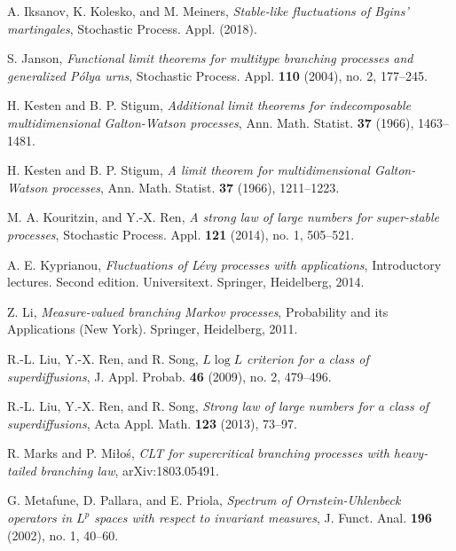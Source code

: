 \documentclass[12pt,a4paper]{amsart}
\theoremstyle{plain}
\theoremstyle{definition}
\numberwithin{equation}{section}
\begin{document}
\begin{thebibliography}{10}
  A. Iksanov, K. Kolesko, and M. Meiners,
  \emph{Stable-like fluctuations of {B}gins' martingales},
  Stochastic Process. Appl. (2018).

  S. Janson,
  \emph{Functional limit theorems for multitype branching processes and generalized {P}\'{o}lya urns},
  Stochastic Process. Appl. \textbf{110} (2004), no. 2, 177--245.

  H. Kesten and B. P. Stigum,
  \emph{Additional limit theorems for indecomposable multidimensional {G}alton-{W}atson processes},
  Ann. Math. Statist. \textbf{37} (1966), 1463--1481.

  H. Kesten and B. P. Stigum,
  \emph{A limit theorem for multidimensional {G}alton-{W}atson processes},
  Ann. Math. Statist. \textbf{37} (1966), 1211--1223.

  M. A. Kouritzin, and Y.-X. Ren,
  \emph{A strong law of large numbers for super-stable processes},
  Stochastic Process. Appl. \textbf{121} (2014), no. 1, 505--521.

  A. E. Kyprianou,
  \emph{Fluctuations of {L}\'{e}vy processes with applications},
    Introductory lectures. Second edition. Universitext. Springer, Heidelberg, 2014.

  Z. Li,
  \emph{Measure-valued branching {M}arkov processes},
  Probability and its Applications (New York). Springer, Heidelberg, 2011.

  R.-L. Liu, Y.-X. Ren, and R. Song,
  \emph{{$L\log L$} criterion for a class of superdiffusions},
  J. Appl. Probab. \textbf{46} (2009), no. 2, 479--496.

  R.-L. Liu, Y.-X. Ren, and R. Song,
  \emph{Strong law of large numbers for a class of superdiffusions},
  Acta Appl. Math. \textbf{123} (2013), 73--97.

  R. Marks and P. Mi{\l}o{\'s},
  \emph{C{LT} for supercritical branching processes with heavy-tailed branching law},
  arXiv:1803.05491.

  G. Metafune, D. Pallara, and E. Priola,
  \emph{Spectrum of {O}rnstein-{U}hlenbeck operators in {$L^p$} spaces with respect to invariant  measures},
  J. Funct. Anal. \textbf{196} (2002), no. 1, 40--60.


\end{thebibliography}
\end{document}
